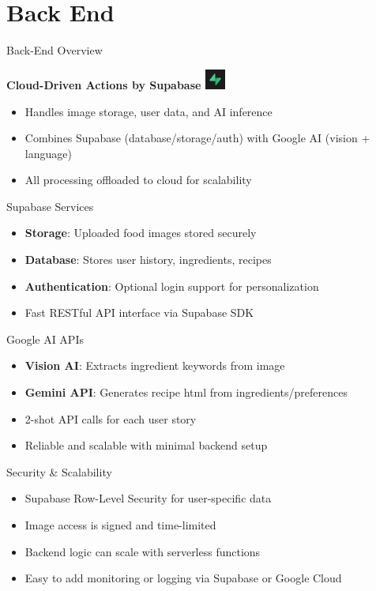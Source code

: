 \documentclass{beamer}
\begin{document}
\section{Back End}

\begin{frame}{Back-End Overview}
    \begin{block}{\textbf{Cloud-Driven Actions by Supabase \includegraphics[width=0.05\textwidth]{pic2.jpeg}}}
        \begin{itemize}
            \item Handles image storage, user data, and AI inference
            \item Combines Supabase (database/storage/auth) with Google AI (vision + language)
            \item All processing offloaded to cloud for scalability
        \end{itemize}
    \end{block}
\end{frame}

\begin{frame}{Supabase Services}
    \begin{itemize}
        \item \textbf{Storage}: Uploaded food images stored securely
        \item \textbf{Database}: Stores user history, ingredients, recipes
        \item \textbf{Authentication}: Optional login support for personalization
        \item Fast RESTful API interface via Supabase SDK
    \end{itemize}
\end{frame}

\begin{frame}{Google AI APIs}
    \begin{itemize}
        \item \textbf{Vision AI}: Extracts ingredient keywords from image
        \item \textbf{Gemini API}: Generates recipe html from ingredients/preferences
        \item 2-shot API calls for each user story
        \item Reliable and scalable with minimal backend setup
    \end{itemize}
\end{frame}

\begin{frame}{Security \& Scalability}
    \begin{itemize}
        \item Supabase Row-Level Security for user-specific data
        \item Image access is signed and time-limited
        \item Backend logic can scale with serverless functions
        \item Easy to add monitoring or logging via Supabase or Google Cloud
    \end{itemize}
\end{frame}
\end{document}
